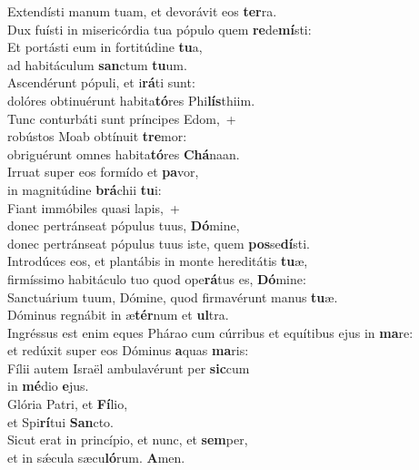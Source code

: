 \oddverse Extendísti manum tuam, et devorávit eos \textbf{ter}ra.~\*\\
\oddverse Dux fuísti in misericórdia tua pópulo quem \textbf{re}de\textbf{mí}sti:\\
\evenverse Et portásti eum in fortitúdine \textbf{tu}a,~\*\\
\evenverse ad habitáculum \textbf{san}ctum \textbf{tu}um.\\
\oddverse Ascendérunt pópuli, et i\textbf{rá}ti sunt:~\*\\
\oddverse dolóres obtinuérunt habita\textbf{tó}res Phi\textbf{lís}thiim.\\
\evenverse Tunc conturbáti sunt príncipes Edom,~+\\
\evenverse  robústos Moab obtínuit \textbf{tre}mor:~\*\\
\evenverse obriguérunt omnes habita\textbf{tó}res \textbf{Chá}naan.\\
\oddverse Irruat super eos formído et \textbf{pa}vor,~\*\\
\oddverse in magnitúdine \textbf{brá}chii \textbf{tu}i:\\
\evenverse Fiant immóbiles quasi lapis,~+\\
\evenverse  donec pertránseat pópulus tuus, \textbf{Dó}mine,~\*\\
\evenverse donec pertránseat pópulus tuus iste, quem \textbf{pos}se\textbf{dí}sti.\\
\oddverse Introdúces eos, et plantábis in monte hereditátis \textbf{tu}æ,~\*\\
\oddverse firmíssimo habitáculo tuo quod ope\textbf{rá}tus es, \textbf{Dó}mine:\\
\evenverse Sanctuárium tuum, Dómine, quod firmavérunt manus \textbf{tu}æ.~\*\\
\evenverse Dóminus regnábit in æ\textbf{tér}num et \textbf{ul}tra.\\
\oddverse Ingréssus est enim eques Phárao cum cúrribus et equítibus ejus in \textbf{ma}re:~\*\\
\oddverse et redúxit super eos Dóminus \textbf{a}quas \textbf{ma}ris:\\
\evenverse Fílii autem Israël ambulavérunt per \textbf{sic}cum~\*\\
\evenverse in \textbf{mé}dio \textbf{e}jus.\\
\oddverse Glória Patri, et \textbf{Fí}lio,~\*\\
\oddverse et Spi\textbf{rí}tui \textbf{San}cto.\\
\evenverse Sicut erat in princípio, et nunc, et \textbf{sem}per,~\*\\
\evenverse et in sǽcula sæcu\textbf{ló}rum. \textbf{A}men.\\
